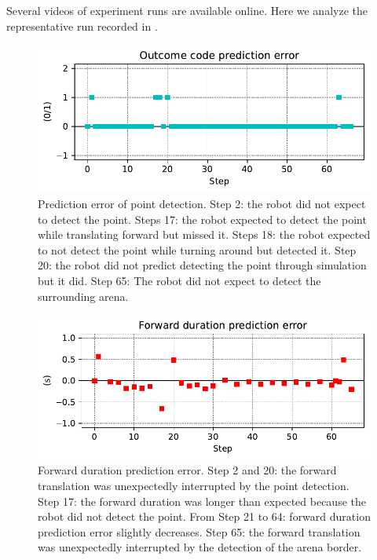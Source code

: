 \documentclass[runningheads]{llncs}
\begin{document}
Several videos of experiment runs are available online. 
Here we analyze the representative run recorded in \cite{georgeon_petitcat_2024}.

\begin{figure}
	\includegraphics[width=\textwidth]{01_Outcome_code.pdf}
	\caption{Prediction error of point detection.
	Step 2: the robot did not expect to detect the point.
	Steps 17: the robot expected to detect the point while translating forward but missed it.
	Steps 18: the robot expected to not detect the point while turning around but detected it.
	Step 20: the robot did not predict detecting the point through simulation but it did. 
	Step 65: The robot did not expect to detect the surrounding arena. } \label{fig:yaw_pe}
\end{figure}

\begin{figure}
	\includegraphics[width=\textwidth]{07_Forward_duration_pe.pdf}
	\caption{Forward duration prediction error.
	Step 2 and 20: the forward translation was unexpectedly interrupted by the point detection.
	Step 17: the forward duration was longer than expected because the robot did not detect the point.
	From Step 21 to 64: forward duration prediction error slightly decreases. 
	Step 65: the forward translation was unexpectedly interrupted by the detection of the arena border.} \label{fig:yaw_re}
\end{figure}
\end{document}
